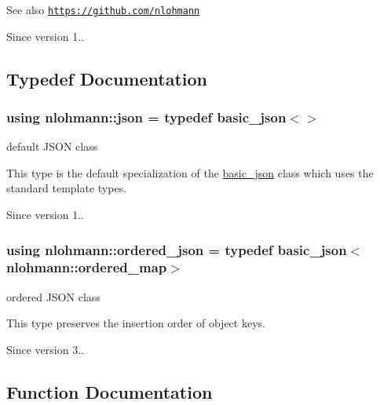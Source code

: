 \begin{DoxySeeAlso}{See also}
\href{https://github.com/nlohmann}{\tt https\+://github.\+com/nlohmann} 
\end{DoxySeeAlso}
\begin{DoxySince}{Since}
version 1.. 
\end{DoxySince}


\subsection{Typedef Documentation}
\subsubsection[{\texorpdfstring{json}{json}}]{\setlength{\rightskip}{0pt plus 5cm}using {\bf nlohmann\+::json} = typedef {\bf basic\+\_\+json}$<$$>$}\hypertarget{namespacenlohmann_a2bfd99e845a2e5cd90aeaf1b1431f474}{}\label{namespacenlohmann_a2bfd99e845a2e5cd90aeaf1b1431f474}


default J\+S\+ON class 

This type is the default specialization of the \hyperlink{classnlohmann_1_1basic__json}{basic\+\_\+json} class which uses the standard template types.

\begin{DoxySince}{Since}
version 1.. 
\end{DoxySince}
\subsubsection[{\texorpdfstring{ordered\+\_\+json}{ordered_json}}]{\setlength{\rightskip}{0pt plus 5cm}using {\bf nlohmann\+::ordered\+\_\+json} = typedef {\bf basic\+\_\+json}$<${\bf nlohmann\+::ordered\+\_\+map}$>$}\hypertarget{namespacenlohmann_ad53cef358adfa7f07cea23eb1e28b9ea}{}\label{namespacenlohmann_ad53cef358adfa7f07cea23eb1e28b9ea}


ordered J\+S\+ON class 

This type preserves the insertion order of object keys.

\begin{DoxySince}{Since}
version 3.. 
\end{DoxySince}


\subsection{Function Documentation}
